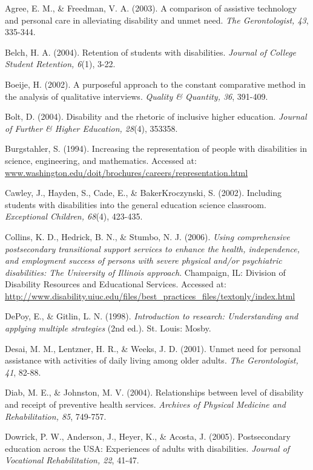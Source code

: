 \documentclass[11.5pt]{sig-alternate} %
\begin{document}
\leftskip 0.25in
\parindent -0.25in 
Agree, E. M., \& Freedman, V. A. (2003). A comparison of assistive technology and personal care in alleviating disability and unmet need. \textit{The Gerontologist, 43}, 335-344.

Belch, H. A. (2004). Retention of students with disabilities. \textit{Journal of College Student Retention, 6}(1), 3-22.

Boeije, H. (2002). A purposeful approach to the constant comparative method in the analysis of qualitative interviews. \textit{Quality \& Quantity, 36}, 391-409.

Bolt, D. (2004). Disability and the rhetoric of inclusive higher education. \textit{Journal of Further \& Higher Education, 28}(4), 353358.

Burgstahler, S. (1994). Increasing the representation of people with disabilities in science, engineering, and mathematics. Accessed at: \url{www.washington.edu/doit/brochures/careers/representation.html}

Cawley, J., Hayden, S., Cade, E., \& BakerKroczynski, S. (2002). Including students with disabilities into the general education science classroom. \textit{Exceptional Children, 68}(4), 423-435.

Collins, K. D., Hedrick, B. N., \& Stumbo, N. J. (2006). \textit{Using comprehensive postsecondary transitional support services to enhance the health, independence, and employment success of persons with severe physical and/or psychiatric disabilities: The University of Illinois approach}. Champaign, IL: Division of Disability Resources and Educational Services. Accessed at: \url{http://www.disability.uiuc.edu/files/best_practices_files/textonly/index.html}

DePoy, E., \& Gitlin, L. N. (1998). \textit{Introduction to research: Understanding and applying multiple strategies} (2nd ed.). St. Louis: Mosby.

Desai, M. M., Lentzner, H. R., \& Weeks, J. D. (2001). Unmet need for personal assistance with activities of daily living among older adults. \textit{The Gerontologist, 41}, 82-88.

Diab, M. E., \& Johnston, M. V. (2004). Relationships between level of disability and receipt of preventive health services. \textit{Archives of Physical Medicine and Rehabilitation, 85}, 749-757.

Dowrick, P. W., Anderson, J., Heyer, K., \& Acosta, J. (2005). Postsecondary education across the USA: Experiences of adults with disabilities. \textit{Journal of Vocational Rehabilitation, 22}, 41-47.
\end{document}
